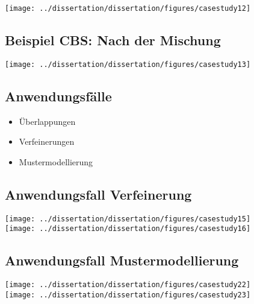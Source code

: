 	\begin{frame}{\insertsectionhead}{\insertsubsectionhead}
		\hfil\texttt{[image: ../dissertation/dissertation/figures/casestudy12]}\hfil
	\end{frame}

	\subsection{Beispiel CBS: Nach der Mischung}

	\begin{frame}{\insertsectionhead}{\insertsubsectionhead}
		\hfil\texttt{[image: ../dissertation/dissertation/figures/casestudy13]}\hfil
	\end{frame}

	\subsection{Anwendungsfälle}

	\begin{frame}{\insertsectionhead}{\insertsubsectionhead}
		\begin{itemize}
			\item Überlappungen
			\item Verfeinerungen
			\item Mustermodellierung
		\end{itemize}
	\end{frame}

	\subsection{Anwendungsfall Verfeinerung}

	\begin{frame}{\insertsectionhead}{\insertsubsectionhead}
		\hfil\texttt{[image: ../dissertation/dissertation/figures/casestudy15]}\hfil\\[.1\textheight]
		\hfil\texttt{[image: ../dissertation/dissertation/figures/casestudy16]}\hfil
	\end{frame}

	\subsection{Anwendungsfall Mustermodellierung}

	\begin{frame}{\insertsectionhead}{\insertsubsectionhead}
		\hfil\texttt{[image: ../dissertation/dissertation/figures/casestudy22]}\hfil\\[.1\textheight]
		\hfil\texttt{[image: ../dissertation/dissertation/figures/casestudy23]}\hfil
	\end{frame}

